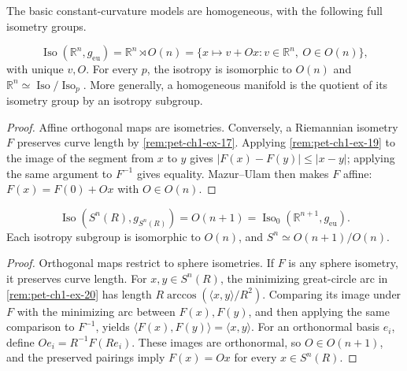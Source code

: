 The basic constant-curvature models are homogeneous, with the following full
isometry groups.

\begin{example}
  \label{ex:pet-ch1-isometry-group-euclidean}


  \[
    \operatorname{Iso}(\mathbb{R}^n,g_{\mathrm{eu}})
      =\mathbb{R}^n\rtimes O(n)
      =\{x\mapsto v+Ox:v\in\mathbb{R}^n,\ O\in O(n)\},
  \]
  with unique $v,O$. For every $p$, the isotropy is isomorphic to $O(n)$ and
  $\mathbb{R}^n\simeq\operatorname{Iso}/\operatorname{Iso}_p$. More generally,
  a homogeneous manifold is the quotient of its isometry group by an isotropy
  subgroup.
\end{example}
\begin{proof}

  \sketch
  Affine orthogonal maps are isometries. Conversely, a Riemannian isometry $F$
  preserves curve length by \cref{rem:pet-ch1-ex-17}. Applying
  \cref{rem:pet-ch1-ex-19} to the image of the segment from $x$ to $y$ gives
  $|F(x)-F(y)|\le |x-y|$; applying the same argument to $F^{-1}$ gives
  equality. Mazur--Ulam then makes $F$ affine:
  $F(x)=F(0)+Ox$ with $O\in O(n)$.
\end{proof}

\begin{example}
  \label{ex:pet-ch1-isometry-group-sphere}


  \[
    \operatorname{Iso}(S^n(R),g_{S^n(R)})=O(n+1)
      =\operatorname{Iso}_0(\mathbb{R}^{n+1},g_{\mathrm{eu}}).
  \]
  Each isotropy subgroup is isomorphic to $O(n)$, and
  $S^n\simeq O(n+1)/O(n)$.
\end{example}
\begin{proof}

  \sketch
  Orthogonal maps restrict to sphere isometries. If $F$ is any sphere
  isometry, it preserves curve length. For $x,y\in S^n(R)$, the minimizing
  great-circle arc in \cref{rem:pet-ch1-ex-20} has length
  $R\arccos(\langle x,y\rangle/R^2)$. Comparing its image under $F$ with the
  minimizing arc between $F(x),F(y)$, and then applying the same comparison to
  $F^{-1}$, yields
  $\langle F(x),F(y)\rangle=\langle x,y\rangle$.
  For an orthonormal basis $e_i$, define $Oe_i=R^{-1}F(Re_i)$. These images are
  orthonormal, so $O\in O(n+1)$, and the preserved pairings imply $F(x)=Ox$
  for every $x\in S^n(R)$.
\end{proof}

